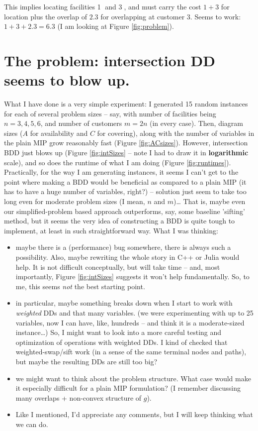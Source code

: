 \documentclass[11pt]{article}
\begin{document}
This implies locating facilities \textcircled{1} and \textcircled{3}, and must
carry the cost \(1+3\) for location plus the overlap of \(2.3\) for overlapping at
customer 3. Seems to work: \(1+3+2.3=6.3\) (I am looking at Figure \ref{fig:problem}).

\section{The problem: intersection DD seems to blow up.}
\label{sec:org68588f8}
What I have done is a very simple experiment: I generated 15 random instances
for each of several problem sizes -- say, with number of facilities being
\(n=3,4,5,6\), and number of customers \(m=2n\) (in every case). Then, diagram sizes
(\(A\) for availability and \(C\) for covering), along with the number of variables
in the plain MIP grow reasonably fast (Figure \ref{fig:ACsizes}). However,
intersection BDD just blows up (Figure \ref{fig:intSizes} -- note I had to draw
it in \textbf{logarithmic} scale), and so does the runtime of what I am doing (Figure
\ref{fig:runtimes}). Practically, for the way I am generating instances, it
seems I can't get to the point where making a BDD would be beneficial as
compared to a plain MIP (it has to have a huge number of variables, right?) --
solution just seem to take too long even for moderate problem sizes (I mean, \(n\)
and \(m\))\ldots{} That is, maybe even our simplified-problem based approach
outperforms, say, some baseline 'sifting' method, but it seems the very idea of
constructing a BDD is quite tough to implement, at least in such straightforward
way. What I was thinking:
\begin{itemize}
\item maybe there is a (performance) bug somewhere, there is always such a
possibility. Also, maybe rewriting the whole story in C++ or Julia would help.
It is not difficult conceptually, but will take time -- and, most importantly,
Figure \ref{fig:intSizes} suggests it won't help fundamentally. So, to me,
this seems \emph{not} the best starting point.
\item in particular, maybe something breaks down when I start to work with
\emph{weighted} DDs and that many variables. (we were experimenting with up to 25
variables, now I can have, like, hundreds -- and think it is a moderate-sized
instance\ldots{}) So, I might want to look into a more careful testing and
optimization of operations with weighted DDs. I kind of checked that
weighted-swap/sift work (in a sense of the same terminal nodes and paths), but
maybe the resulting DDs are still too big?
\item we might want to think about the problem structure. What case would make it
especially difficult for a plain MIP formulation? (I remember discussing many
overlaps + non-convex structure of \(g\)).
\item Like I mentioned, I'd appreciate any comments, but I will keep thinking what we can do.
\end{itemize}
\end{document}
